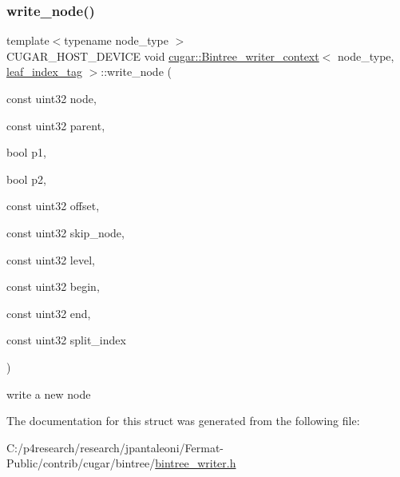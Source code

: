 \subsubsection{\texorpdfstring{write\+\_\+node()}{write\_node()}}
{\footnotesize\ttfamily template$<$typename node\+\_\+type $>$ \\
C\+U\+G\+A\+R\+\_\+\+H\+O\+S\+T\+\_\+\+D\+E\+V\+I\+CE void \hyperlink{structcugar_1_1_bintree__writer__context}{cugar\+::\+Bintree\+\_\+writer\+\_\+context}$<$ node\+\_\+type, \hyperlink{structcugar_1_1leaf__index__tag}{leaf\+\_\+index\+\_\+tag} $>$\+::write\+\_\+node (\begin{DoxyParamCaption}\item[{const uint32}]{node,  }\item[{const uint32}]{parent,  }\item[{bool}]{p1,  }\item[{bool}]{p2,  }\item[{const uint32}]{offset,  }\item[{const uint32}]{skip\+\_\+node,  }\item[{const uint32}]{level,  }\item[{const uint32}]{begin,  }\item[{const uint32}]{end,  }\item[{const uint32}]{split\+\_\+index }\end{DoxyParamCaption})\hspace{0.3cm}{\ttfamily [inline]}}

write a new node 

The documentation for this struct was generated from the following file\+:\begin{DoxyCompactItemize}
\item 
C\+:/p4research/research/jpantaleoni/\+Fermat-\/\+Public/contrib/cugar/bintree/\hyperlink{bintree__writer_8h}{bintree\+\_\+writer.\+h}\end{DoxyCompactItemize}

